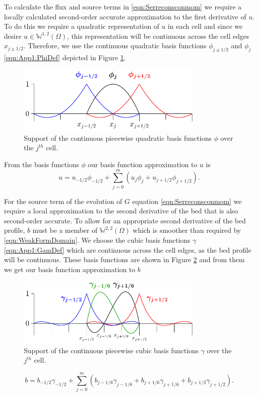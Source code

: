 To calculate the flux and source terms in \eqref{eqn:Serreconsconmom} we require a locally  calculated second-order accurate approximation to the first derivative of $u$. To do this we require a quadratic representation of $u$ in each cell and since we desire $u\in\mathbb{W}^{1,2}(\Omega)$, this representation will be continuous across the cell edges $x_{j \pm 1/2}$. Therefore, we use the continuous quadratic basis functions $\phi_{j\pm1/2} $ and $\phi_{j} $ \eqref{eqn:App1:PhiDef} depicted in Figure \ref{fig:P2ContBasis}.
\begin{figure}
	\centering
	\includegraphics[width=0.8\textwidth]{./chp3/figures/P2.pdf}
	\caption{Support of the continuous piecewise quadratic basis functions $\phi$ over the $j^{th}$ cell.}
	\label{fig:P2ContBasis}
\end{figure}

From the basis functions $\phi$ our basis function approximation to $u$ is
\begin{equation}
u = u_{-1/2}\phi_{-1/2} + \sum_{j=0}^m \left( u_{j}\phi_{j} + u_{j+1/2}\phi_{j+1/2} \right).
\label{eqn:FEapproxtou}
\end{equation}

For the source term of the evolution of $G$ equation \eqref{eqn:Serreconsconmom} we require a local approximation to the second derivative of the bed that is also second-order accurate. To allow for an appropriate second derivative of the bed profile, $b$ must be a member of $\mathbb{W}^{2,2}(\Omega)$ which is smoother than required by \eqref{eqn:WeakFormDomain}. We choose the cubic basis functions $\gamma$ \eqref{eqn:App1:GamDef} which are continuous across the cell edges, as the bed profile will be continuous. These basis functions are shown in Figure \ref{fig:P3ContBasis} and from them we get our basis function approximation to $b$
\begin{figure}
	\centering
	\includegraphics[width=0.8\textwidth]{./chp3/figures/P3.pdf}
	\caption{Support of the continuous piecewise cubic basis functions $\gamma$ over the $j^{th}$ cell.}
	\label{fig:P3ContBasis}
\end{figure}
\begin{equation}
b = b_{-1/2}\gamma_{-1/2} +  \sum_{j=0}^m \left(b_{j-1/6}\gamma_{j-1/6}  + b_{j+1/6}\gamma_{j+1/6} + b_{j+1/2}\gamma_{j+1/2} \right).
\label{eqn:FEapproxtob}
\end{equation}

